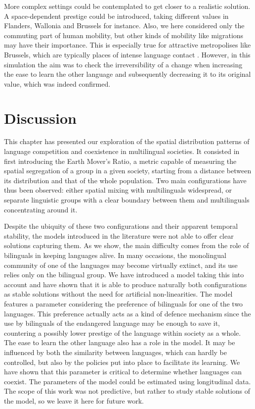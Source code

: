 \documentclass[../thesis.tex]{subfiles}
\begin{document}
More complex settings could be contemplated to get closer to a realistic solution. A
space-dependent prestige could be introduced, taking different values in Flanders,
Wallonia and Brussels for instance. Also, we here considered only the commuting part of
human mobility, but other kinds of mobility like migrations may have their importance.
This is especially true for attractive metropolises like Brussels, which are typically
places of intense language contact \cite{SimonCitiesTranslation2011}. However, in this
simulation the aim was to check the irreversibility of a change when increasing the ease
to learn the other language and subsequently decreasing it to its original value, which
was indeed confirmed. 



\section{Discussion}
\label{sec:multiling_discussion}
This chapter has presented our exploration of the spatial distribution patterns of
language competition and coexistence in multilingual societies. It consisted in first
introducing the Earth Mover's Ratio, a metric capable of measuring the spatial
segregation of a group in a given society, starting from a distance between its
distribution and that of the whole population. Two main configurations have thus been
observed: either spatial mixing with multilinguals widespread, or separate linguistic
groups with a clear boundary between them and multilinguals concentrating around it. 

Despite the ubiquity of these two configurations and their apparent temporal stability,
the models introduced in the literature were not able to offer clear solutions capturing
them. As we show, the main difficulty comes from the role of bilinguals in keeping
languages alive. In many occasions, the monolingual community of one of the languages
may become virtually extinct, and its use relies only on the bilingual group. We have
introduced a model taking this into account and have shown that it is able to produce
naturally both configurations as stable solutions without the need for artificial
non-linearities. The model features a parameter considering the preference of bilinguals
for one of the two languages. This preference actually acts as a kind of defence
mechanism since the use by bilinguals of the endangered language may be enough to save
it, countering a possibly lower prestige of the language within society as a whole. The
ease to learn the other language also has a role in the model. It may be influenced by
both the similarity between languages, which can hardly be controlled, but also by the
policies put into place to facilitate its learning. We have shown that this parameter is
critical to determine whether languages can coexist. The parameters of the model could
be estimated using longitudinal data. The scope of this work was not predictive, but
rather to study stable solutions of the model, so we leave it here for future work.
\end{document}
